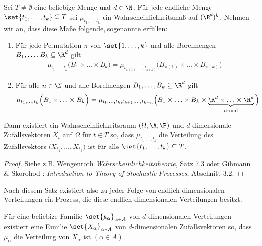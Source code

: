 \begin{satz}\label{satz:1.3.6ExistenzsatzVonKolmo}\enter
	Sei $T\neq\emptyset$ eine beliebige Menge und $d\in\N$.
	Für jede endliche Menge $\set{t_1,\ldots,t_k}\subseteq T$ sei $\mu_{t_1,\ldots,t_k}$ ein Wahrscheinlichkeitsmaß auf $(\R^d)^k$.
	Nehmen wir an, dass diese Maße folgende, sogenannte  erfüllen:
	\begin{enumerate}[label=(\roman*)]
		\item Für jede Permutation $\pi$ von $\set{1,\ldots,k}$ und alle Borelmengen $B_1,\ldots,B_k\subseteq\R^d$ gilt
		\begin{align*}
			\mu_{t_1,\ldots,t_k}\Big(B_1\times\ldots\times B_k\Big)
			=\mu_{t_{\pi(1)},\ldots,t_{\pi(k)}}\Big(B_{\pi(1)}\times\ldots\times B_{\pi(k)}\Big)
		\end{align*}
		\item Für alle $n\in\N$ und alle Borelmengen $B_1,\ldots,B_k\subseteq\R^d$ gilt
		\begin{align*}
			\mu_{t_1,\ldots,t_k}\Big(B_1\times\ldots\times B_k\Big)
			=\mu_{t_1,\ldots,t_k,t_{k+1},\ldots,t_{k+n}}\Big(B_1\times\ldots\times	 B_k\times\underbrace{\R^d\times\ldots\times\R^d}_{n\text{-mal}}\Big)
		\end{align*}
	\end{enumerate}		
	Dann existiert ein Wahrscheinlichkeitsraum $(\Omega,\A,\P)$ und $d$-dimensionale Zufallsvektoren $X_t$ auf $\Omega$ für $t\in T$ so, dass
	$\mu_{t_1,\ldots,t_k}$ die Verteilung des Zufallsvektors $\big(X_{t_1},\ldots,X_{t_k}\big)$ ist für alle $\set{t_1,\ldots,t_k}\subseteq T$.
\end{satz}

\begin{proof}
	Siehe z.B. Wengenroth \cite{wengenroth2008wahrscheinlichkeitstheorie}  \emph{Wahrscheinlichkeitstheorie}, Satz 7.3 oder 
	Gihmann \& Skorohod \cite{gikhman1977introduction}: \emph{Introduction to Theory of Stochastic Processes}, Abschnitt 3.2. 
\end{proof}

Nach diesem Satz existiert also zu jeder Folge von  endlich dimensionalen Verteilungen ein Prozess, die diese endlich dimensionalen Verteilungen besitzt.

\begin{folgerung}\label{folgerung1.3.7}
	Für eine beliebige Familie $\set{\mu_\alpha}_{\alpha\in A}$ von $d$-dimensionalen Verteilungen existiert eine Familie $\set{X_\alpha}_{\alpha\in A}$ von  $d$-dimensionalen Zufallsvektoren so, dass $\mu_\alpha$ die Verteilung von $X_\alpha$ ist $(\alpha\in A)$.
\end{folgerung}

